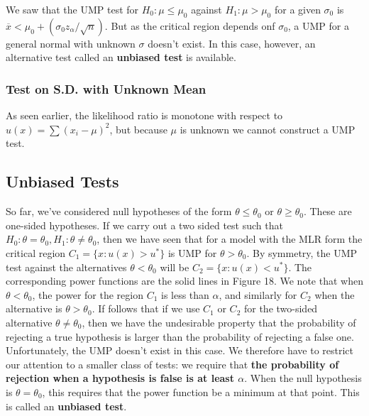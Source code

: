 \documentclass{article}
\begin{document}
We saw that the UMP test for \(H_0: \mu \leq \mu_0\) against \(H_1:\mu>\mu_0\) for a given \(\sigma_0\) is \(\overline{x}
<\mu_0+(\sigma_0 z_\alpha /\sqrt{n})\). But as the critical region depends onf \(\sigma_0\), a UMP for a general normal with unknown \(\sigma\) doesn't exist. In this case, however, an alternative test called an \textbf{unbiased test} is available.

\subsubsection{Test on S.D. with Unknown Mean}

As seen earlier, the likelihood ratio is monotone with respect to \(u(x)=\sum (x_i-\mu)^2\), but because $\mu$ is unknown we cannot construct a UMP test.

\subsection{Unbiased Tests}

So far, we've considered null hypotheses of the form \(\theta \leq \theta_0\) or \(\theta \geq \theta_0\). These are one-sided hypotheses. If we carry out a two sided test such that \(H_0: \theta=\theta_0, H_1: \theta \neq \theta_0\), then we have seen that for a model with the MLR form the critical region \(C_1=\{x:u(x)>u^*\}\) is UMP for \(\theta>\theta_0\). By symmetry, the UMP test against the alternatives \(\theta<\theta_0\) will be \(C_2=\{x:u(x)<u^*\}\). The corresponding power functions are the solid lines in Figure 18. We note that when \(\theta<\theta_0\), the power for the region \(C_1\) is less than \(\alpha\), and similarly for \(C_2\) when the alternative is \(\theta>\theta_0\). If follows that if we use \(C_1\) or \(C_2\) for the two-sided alternative \(\theta \neq \theta_0\), then we have the undesirable property that the probability of rejecting a true hypothesis is larger than the probability of rejecting a false one. Unfortunately, the UMP doesn't exist in this case. We therefore have to restrict our attention to a smaller class of tests: we require that \textbf{the probability of rejection when a hypothesis is false is at least \(\alpha\)}. When the null hypothesis is \(\theta=\theta_0\), this requires that the power function be a minimum at that point. This is called an \textbf{unbiased test}.
\end{document}
